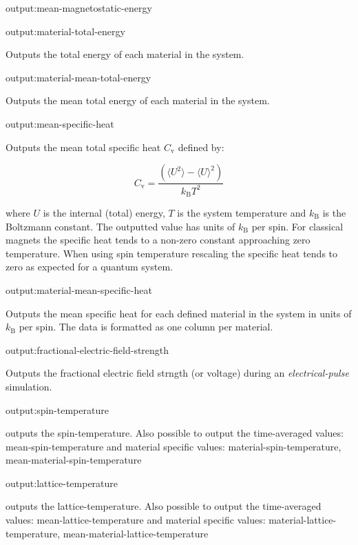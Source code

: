 {\zicf output:mean-magnetostatic-energy}

{\zicf output:material-total-energy} Outputs the total energy of each material in the system.

{\zicf output:material-mean-total-energy} Outputs the mean total energy of each material in the system.

{\zicf output:mean-specific-heat} Outputs the mean total specific heat $C_{\mathrm{v}}$ defined by:

\begin{equation*}
C_{\mathrm{v}} = \frac{\left(\langle U^2 \rangle - \langle U \rangle^2 \right)}{k_{\mathrm{B}} T^2}
\end{equation*}

\noindent where $U$ is the internal (total) energy, $T$ is the system temperature and $k_{\mathrm{B}}$ is the Boltzmann constant. The outputted value has units of $k_{\mathrm{B}}$ per spin. For classical magnets the specific heat tends to a non-zero constant approaching zero temperature. When using spin temperature rescaling the specific heat tends to zero as expected for a quantum system.

{\zicf output:material-mean-specific-heat} Outputs the mean specific heat for each defined material in the system in units of $k_{\mathrm{B}}$ per spin. The data is formatted as one column per material.

{\zicf output:fractional-electric-field-strength}
Outputs the fractional electric field strngth (or voltage) during an \textit{electrical-pulse} simulation.


{\zicf output:spin-temperature} outputs the spin-temperature. Also possible to output the time-averaged values: mean-spin-temperature and material specific values: material-spin-temperature, mean-material-spin-temperature

{\zicf output:lattice-temperature} outputs the lattice-temperature. Also possible to output the time-averaged values: mean-lattice-temperature and material specific values: material-lattice-temperature, mean-material-lattice-temperature



